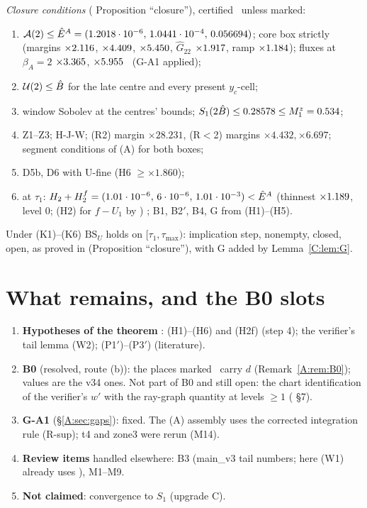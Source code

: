\documentclass[11pt]{article}
\begin{document}
\noindent\emph{Closure conditions} ( Proposition ``closure''), certified \tC\ unless marked:
\begin{enumerate}[label=(K\arabic*),leftmargin=2.6em]
\item $\mathcal A(2)\le\hat E^A=(1.2018\cdot10^{-6},\,1.0441\cdot10^{-4},\,0.056694)$; core box strictly (margins $\times2.116$, $\times4.409$, $\times5.450$, $\hat G_{22}$ $\times1.917$, ramp $\times1.184$); fluxes at $\beta_A=2$ $\times3.365$, $\times5.955$ \tB\ (G-A1 applied);
\item $\mathcal U(2)\le\hat B$ for the late centre and every present $y_c$-cell;
\item window Sobolev at the centres' bounds; $S_1(2\hat B)\le0.28578\le M_1^z=0.534$;
\item Z1--Z3; H-J-W; (R2) margin $\times28.231$, (R$<$2) margins $\times4.432,\times6.697$; segment conditions of (A) for both boxes;
\item D5b, D6 with U-fine (H6 $\ge\times1.860$);
\item at $\tau_1$: $H_2+H^f_2=(1.01\cdot10^{-6},\,6\cdot10^{-6},\,1.01\cdot10^{-3})<\hat E^A$ (thinnest $\times1.189$, level 0; (H2) for $f-U_1$ by ) \tB; B1, B2$'$, B4, G from (H1)--(H5).
\end{enumerate}
Under (K1)--(K6) $\mathrm{BS}_U$ holds on $[\tau_1,\tau_{\max})$: implication step, nonempty, closed, open, as proved in  (Proposition ``closure''), with G added by Lemma~\ref{C:lem:G}.



\section{What remains, and the B0 slots}\label{M:sec:remains}
\begin{enumerate}[leftmargin=*]
\item \textbf{Hypotheses of the theorem} \tH: (H1)--(H6) and (H2f) (step 4); the verifier's tail lemma (W2); (P1$'$)--(P3$'$) (literature).
\item \textbf{B0} (resolved, route (b)): the places marked \tB\ carry $d$ (Remark~\ref{A:rem:B0}); values are the v34 ones. Not part of B0 and still open: the chart identification of the verifier's $w'$ with the ray-graph quantity at levels $\ge1$ ( \S7).
\item \textbf{G-A1} (\S\ref{A:sec:gaps}): fixed. The (A) assembly uses the corrected integration rule (R-sup); t4 and zone3 were rerun (M14).
\item \textbf{Review items} handled elsewhere: B3 (main\_v3 tail numbers; here (W1) already uses ), M1--M9.
\item \textbf{Not claimed}: convergence to $S_1$ (upgrade C).
\end{enumerate}
\end{document}
